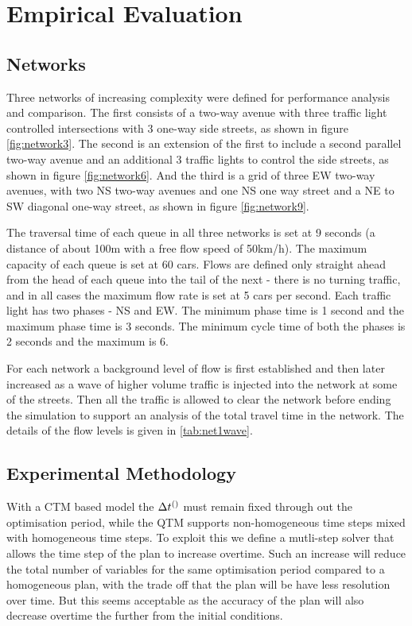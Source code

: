 
\section{Empirical Evaluation}


\subsection{Networks}

Three networks of increasing complexity were defined for performance
analysis and comparison. The first consists of a two-way avenue with
three traffic light controlled intersections with 3 one-way side
streets, as shown in figure \ref{fig:network3}. The second is an
extension of the first to include a second parallel two-way avenue and
an additional 3 traffic lights to control the side streets, as shown
in figure \ref{fig:network6}. And the third is a grid of three EW
two-way avenues, with two NS two-way avenues and one NS one way street
and a NE to SW diagonal one-way street, as shown in figure
\ref{fig:network9}.

The traversal time of each queue in all three networks is set at 9
seconds (a distance of about 100m with a free flow speed of
50km/h). The maximum capacity of each queue is set at 60 cars. Flows
are defined only straight ahead from the head of each queue into the
tail of the next - there is no turning traffic, and in all cases the
maximum flow rate is set at 5 cars per second. Each traffic light has
two phases - NS and EW. The minimum phase time is 1 second and the
maximum phase time is 3 seconds. The minimum cycle time of both the
phases is 2 seconds and the maximum is 6.

For each network a background level of flow is first established and
then later increased as a wave of higher volume traffic is injected
into the network at some of the streets. Then all the traffic is
allowed to clear the network before ending the simulation to support
an analysis of the total travel time in the network. The details of
the flow levels is given in \cref{tab:net1wave}.

\subsection{Experimental Methodology}

With a CTM based model the $\DT[]$ must remain fixed through out the
optimisation period, while the QTM supports non-homogeneous time steps
mixed with homogeneous time steps. To exploit this we define a
mutli-step solver that allows the time step of the plan to increase
overtime. Such an increase will reduce the total number of variables
for the same optimisation period compared to a homogeneous plan, with
the trade off that the plan will be have less resolution over
time. But this seems acceptable as the accuracy of the plan will also
decrease overtime the further from the initial conditions.

